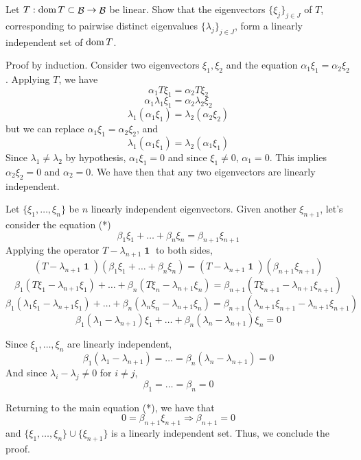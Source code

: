 \documentclass{article}
\theoremstyle{exercisestyle}
\newenvironment{exercise}[1]
  {\renewcommand\theinnerex{#1}\innerex}
  {\endinnerex}
\DeclareMathOperator{\banach}{\mathcal{B}}
\DeclareMathOperator{\Id}{\textbf{1}}
\begin{document}
\begin{exercise}{1.5.5}
    Let $T : \dom T \subset \banach \to \banach$ be linear. Show that the eigenvectors $\{\xi_j \}_{j\in J}$ of $T$, corresponding to pairwise distinct eigenvalues $\{\lambda_j\}_{j\in J}$,
    form a linearly independent set of $\operatorname{dom} T$.

    Proof by induction. Consider two eigenvectors $\xi_1, \xi_2$ and the equation $\alpha_1 \xi_1 = \alpha_2 \xi_2$. Applying $T$, we have
    $$ \alpha_1 T \xi_1 = \alpha_2 T \xi_2$$
    $$ \alpha_1 \lambda_1 \xi_1 = \alpha_2 \lambda_2 \xi_2$$
    $$ \lambda_1 (\alpha_1 \xi_1) = \lambda_2 (\alpha_2  \xi_2) $$
    but we can replace $\alpha_1 \xi_1 = \alpha_2 \xi_2$, and
    $$ \lambda_1 (\alpha_1 \xi_1) = \lambda_2 (\alpha_1  \xi_1) $$
    Since $\lambda_1 \neq \lambda_2$ by hypothesis, $ \alpha_1 \xi_1 = 0$ and since $\xi_1 \neq 0$, $\alpha_1 = 0$. This implies $\alpha_2 \xi_2 = 0$ and $\alpha_2 = 0$.
    We have then that any two eigenvectors are linearly independent.

    Let $\{\xi_1, \dots, \xi_n\}$ be $n$ linearly independent eigenvectors. Given another $\xi_{n+1}$, let's consider the equation (*)
    $$ \beta_1 \xi_1 + \dots + \beta_n \xi_n = \beta_{n+1} \xi_{n+1}$$
    Applying the operator $T-\lambda_{n+1}\Id$ to both sides,
    $$ (T-\lambda_{n+1}\Id) (\beta_1 \xi_1 + \dots + \beta_n \xi_n) = (T-\lambda_{n+1}\Id)(\beta_{n+1} \xi_{n+1})$$
    $$ \beta_1 (T\xi_1-\lambda_{n+1}\xi_1) + \dots + \beta_n (T\xi_n-\lambda_{n+1}\xi_n) = \beta_{n+1} (T\xi_{n+1} - \lambda_{n+1}\xi_{n+1})$$
    $$ \beta_1 (\lambda_1\xi_1-\lambda_{n+1}\xi_1) + \dots + \beta_n (\lambda_n\xi_n-\lambda_{n+1}\xi_n) = \beta_{n+1} (\lambda_{n+1}\xi_{n+1} - \lambda_{n+1}\xi_{n+1})$$
    $$ \beta_1 (\lambda_1-\lambda_{n+1})\xi_1 + \dots + \beta_n (\lambda_n-\lambda_{n+1})\xi_n = 0$$

    Since $\xi_1, \dots, \xi_n$ are linearly independent,
    $$ \beta_1 (\lambda_1-\lambda_{n+1}) = \dots = \beta_n (\lambda_n-\lambda_{n+1}) = 0$$
    And since $\lambda_i - \lambda_j \neq 0$ for $i \neq j$,
    $$ \beta_1 = \dots = \beta_n = 0$$

    Returning to the main equation (*), we have that
    $$ 0 = \beta_{n+1} \xi_{n+1} \Rightarrow \beta_{n+1} = 0$$
    and $\{\xi_1, \dots, \xi_n\} \cup \{ \xi_{n+1}\}$ is a linearly independent set. Thus, we conclude the proof.

\end{exercise}
\end{document}
